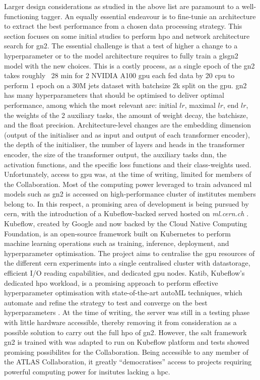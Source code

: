 Larger design considerations as studied in the above list are paramount to a well-functioning tagger. An equally essential endeavour is to fine-tunie an architecture to extract the best performance from a chosen data processing strategy. This section focuses on some initial studies to perform \gls{hpo} and network architecture search for \gls{gn2}. The essential challenge is that a test of higher a change to a hyperparameter or to the model architecture requires to fully train a gls{gn2} model with the new choices. This is a costly process, as a single epoch of the \gls{gn2} takes roughly ~28 min for 2 NVIDIA A100 \gls{gpu} each fed data by 20 \gls{cpu} to perform 1 epoch on a 30M jets dataset with batchsize 2k split on the \gls{gpu}. \gls{gn2} has many hyperparameters that should be optimised to deliver optimal performance, among which the most relevant are: initial $lr$, maximal $lr$, end $lr$, the weights of the 2 auxiliary tasks, the amount of weight decay, the batchisze, and the float precision. Architecture-level changes are the embedding dimension (output of the initialiser and as input and output of each transformer encoder), the depth of the initialiser, the number of layers and heads in the transformer encoder, the size of the transformer output, the auxiliary tasks \gls{dnn}, the activation functions, and the specific loss functions and their class-weights used. \\

Unfortunately, access to \gls{gpu} was, at the time of writing, limited for members of the Collaboration. Most of the computing power leveraged to train advanced \gls{ml} models such as \gls{gn2} is accessed on high-performance cluster of institutes members belong to. In this respect, a promising area of development is being pursued by \gls{cern}, with the introduction of a Kubeflow-backed served hosted on \textit{ml.cern.ch} \cite{KubeflowCern}. Kubeflow, created by Google and now backed by the Cloud Native Computing Foundation, is an open-source framework built on Kubernetes to perform machine learning operations such as training, inference, deployment, and hyperparameter optimisation. The project aims to centralise the \gls{gpu} resources of the different \gls{cern} experiments into a single centralised cluster with datastorage, efficient I/O reading capabilities, and dedicated \gls{gpu} nodes. Katib, Kubeflow's dedicated \gls{hpo} workload, is a promising approach to perform effective hyperparameter optimisation with state-of-the-art autoML techniques, which automate and refine the strategy to test and converge on the best hyperparameters \cite{george2020katib}. At the time of writing, the server was still in a testing phase with little hardware accessible, thereby removing it from consideration as a possible solution to carry out the full \gls{hpo} of \gls{gn2}. However, the salt framework \gls{gn2} is trained with was adapted to run on Kubeflow platform and tests showed promising possibilites for the Collaboration. Being accessible to any member of the ATLAS Collaboration, it greatly ``democratises'' access to projects requiring powerful computing power for insitutes lacking a \gls{hpc}. \\

